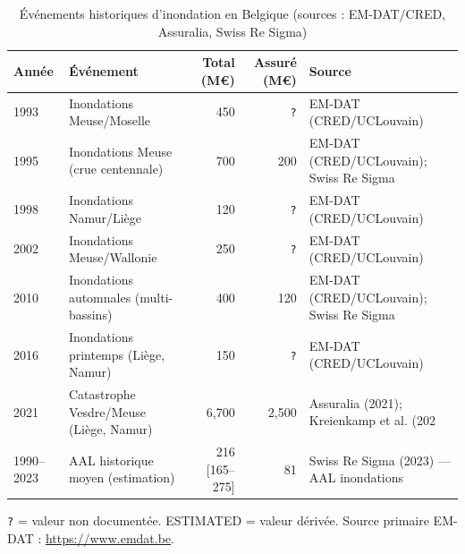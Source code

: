 \begin{table}[htbp]
\centering
\caption{Événements historiques d'inondation en Belgique (sources : EM-DAT/CRED, Assuralia, Swiss Re Sigma)}
\label{tab:historique}
\begin{tabular}{lp{4.5cm}rrl}
\hline
\textbf{Année} & \textbf{Événement} & \textbf{Total (M€)} & \textbf{Assuré (M€)} & \textbf{Source} \\
\hline
1993 & Inondations Meuse/Moselle & 450 & \texttt{?} & \footnotesize{EM-DAT (CRED/UCLouvain)} \\
1995 & Inondations Meuse (crue centennale) & 700 & 200 & \footnotesize{EM-DAT (CRED/UCLouvain); Swiss Re Sigma } \\
1998 & Inondations Namur/Li\`ege & 120 & \texttt{?} & \footnotesize{EM-DAT (CRED/UCLouvain)} \\
2002 & Inondations Meuse/Wallonie & 250 & \texttt{?} & \footnotesize{EM-DAT (CRED/UCLouvain)} \\
2010 & Inondations automnales (multi-bassins) & 400 & 120 & \footnotesize{EM-DAT (CRED/UCLouvain); Swiss Re Sigma } \\
2016 & Inondations printemps (Li\`ege, Namur) & 150 & \texttt{?} & \footnotesize{EM-DAT (CRED/UCLouvain)} \\
2021 & Catastrophe Vesdre/Meuse (Li\`ege, Namur) & 6,700 & 2,500 & \footnotesize{Assuralia (2021); Kreienkamp et al. (202} \\
1990--2023 & AAL historique moyen (estimation) & 216 [165–275] & ~81 & \footnotesize{Swiss Re Sigma (2023) — AAL inondations } \\
\hline
\end{tabular}
\begin{tablenotes}\footnotesize
\item \texttt{?} = valeur non documentée. ESTIMATED = valeur dérivée. Source primaire EM-DAT : \url{https://www.emdat.be}.
\end{tablenotes}
\end{table}
